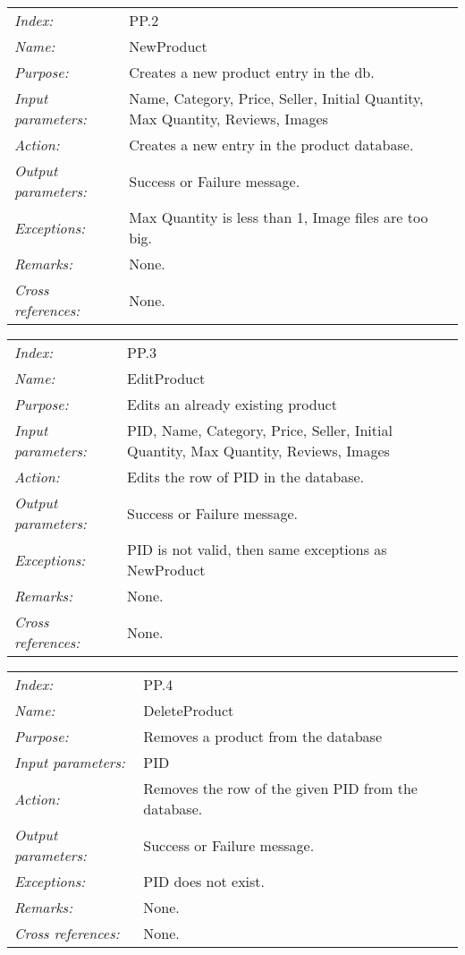 \documentclass[10pt,letter]{article}
\begin{document}
\begin{tabularx}{\textwidth}{l X}
    \it{Index:} & PP.2 \\
    \it{Name:} & NewProduct \\
    \it{Purpose:} & Creates a new product entry in the db.\\
    \it{Input parameters:} & Name, Category, Price, Seller, Initial Quantity, Max Quantity, Reviews, Images\\
    \it{Action:} & Creates a new entry in the product database.\\
    \it{Output parameters:} & Success or Failure message. \\
    \it{Exceptions:} & Max Quantity is less than 1, Image files are too big. \\
    \it{Remarks:} & None. \\
    \it{Cross references:} & None. \\
    \hline
\end{tabularx}

\begin{tabularx}{\textwidth}{l X}
    \it{Index:} & PP.3 \\
    \it{Name:} & EditProduct \\
    \it{Purpose:} & Edits an already existing product \\
    \it{Input parameters:} & PID, Name, Category, Price, Seller, Initial Quantity, Max Quantity, Reviews, Images\\
    \it{Action:} & Edits the row of PID in the database.\\
    \it{Output parameters:} & Success or Failure message. \\
    \it{Exceptions:} & PID is not valid, then same exceptions as NewProduct \\
    \it{Remarks:} & None. \\
    \it{Cross references:} & None. \\
    \hline
\end{tabularx}

\begin{tabularx}{\textwidth}{l X}
    \it{Index:} & PP.4 \\
    \it{Name:} & DeleteProduct \\
    \it{Purpose:} & Removes a product from the database\\
    \it{Input parameters:} & PID\\
    \it{Action:} & Removes the row of the given PID from the database.\\
    \it{Output parameters:} & Success or Failure message. \\
    \it{Exceptions:} & PID does not exist. \\
    \it{Remarks:} & None. \\
    \it{Cross references:} & None. \\
    \hline
\end{tabularx}
\end{document}
